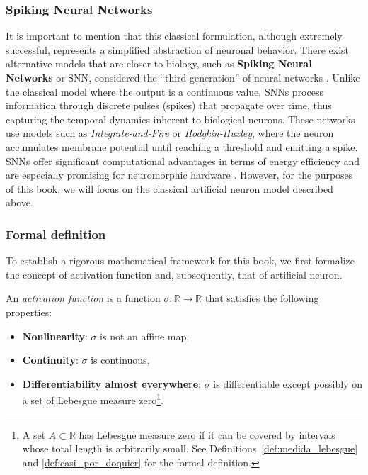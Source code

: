 \subsubsection{Spiking Neural Networks}

It is important to mention that this classical formulation, although extremely successful, represents a simplified abstraction of neuronal behavior. There exist alternative models that are closer to biology, such as \textbf{Spiking Neural Networks} or \gls{SNN}, considered the ``third generation'' of neural networks \citep{Maass1997spiking}. Unlike the classical model where the output is a continuous value, \glspl{SNN} process information through discrete pulses (spikes) that propagate over time, thus capturing the temporal dynamics inherent to biological neurons. These networks use models such as \textit{Integrate-and-Fire} or \textit{Hodgkin-Huxley}, where the neuron accumulates membrane potential until reaching a threshold and emitting a spike. \glspl{SNN} offer significant computational advantages in terms of energy efficiency and are especially promising for neuromorphic hardware \citep{Tavanaei2018deep}. However, for the purposes of this book, we will focus on the classical artificial neuron model described above.

\subsubsection{Formal definition}

To establish a rigorous mathematical framework for this book, we first formalize the concept of activation function and, subsequently, that of artificial neuron.

\begin{definition}\label{def:funcion_activacion}
	An \textit{activation function} is a function $\sigma: \mathbb{R} \to \mathbb{R}$ that satisfies the following properties:
	\begin{itemize}
		\item \textbf{Nonlinearity}: $\sigma$ is not an affine map,
		\item \textbf{Continuity}: $\sigma$ is continuous,
		\item \textbf{Differentiability almost everywhere}: $\sigma$ is differentiable except possibly on a set of Lebesgue measure zero\footnote{A set $A \subset \mathbb{R}$ has Lebesgue measure zero if it can be covered by intervals whose total length is arbitrarily small. See Definitions~\ref{def:medida_lebesgue} and \ref{def:casi_por_doquier} for the formal definition.}.
	\end{itemize}
\end{definition}

